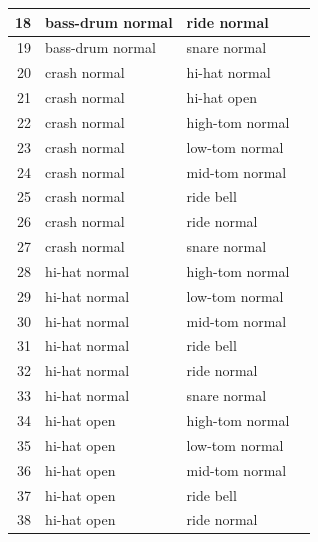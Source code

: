 \begin{appendices}
\begin{figure}[H]
\begin{tiny}
\begin{tabular}{r|l|l|l|}
                    \hline
                    18 & bass-drum normal & ride normal & \\
                    \hline
                    19 & bass-drum normal & snare normal & \\
                    \hline
                    20 & crash normal & hi-hat normal & \\
                    \hline
                    21 & crash normal & hi-hat open & \\
                    \hline
                    22 & crash normal & high-tom normal & \\
                    \hline
                    23 & crash normal & low-tom normal & \\
                    \hline
                    24 & crash normal & mid-tom normal & \\
                    \hline
                    25 & crash normal & ride bell & \\
                    \hline
                    26 & crash normal & ride normal & \\
                    \hline
                    27 & crash normal & snare normal & \\
                    \hline
                    28 & hi-hat normal & high-tom normal & \\
                    \hline
                    29 & hi-hat normal & low-tom normal & \\
                    \hline
                    30 & hi-hat normal & mid-tom normal & \\
                    \hline
                    31 & hi-hat normal & ride bell & \\
                    \hline
                    32 & hi-hat normal & ride normal & \\
                    \hline
                    33 & hi-hat normal & snare normal & \\
                    \hline
                    34 & hi-hat open & high-tom normal & \\
                    \hline
                    35 & hi-hat open & low-tom normal & \\
                    \hline
                    36 & hi-hat open & mid-tom normal & \\
                    \hline
                    37 & hi-hat open & ride bell & \\
                    \hline
                    38 & hi-hat open & ride normal & \\

\end{tabular}
\end{tiny}
\end{figure}
\end{appendices}
